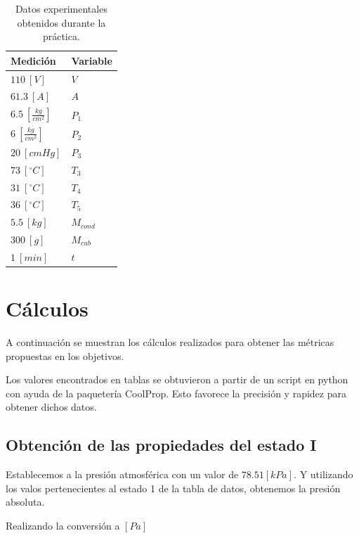 \documentclass[12pt,letterpaper]{article}
\begin{document}
\begin{table}[H] \label{tab:data}
\centering
\renewcommand{\arraystretch}{1.4}
    \begin{tabular}{|l|l|}
    \hline
    \textbf{Medición} & \textbf{Variable} \\
    \hline
    $110\ [V]$  & $V$ \\
    \hline
    $61.3\ [A]$  & $A$ \\
    \hline
    $6.5\ \left[\frac{kg}{cm^2}\right]$  
                 & $P_1$ \\
    \hline
    $6\ \left[\frac{kg}{cm^2}\right]$  
                 & $P_2$ \\
    \hline
    $20\ [cm Hg]$  & $P_3$ \\
    \hline
    $73\ [^\circ C]$  & $T_3$ \\
    \hline
    $31\ [^\circ C]$  & $T_4$ \\
    \hline
    $36\ [^\circ C]$  & $T_5$ \\
    \hline
    $5.5\ [kg]$  & $M_{cond}$ \\
    \hline
    $300\ [g]$  & $M_{cub}$ \\
    \hline
    $1\ [min]$  & $t$ \\
    \hline
    \end{tabular}
\caption{Datos experimentales obtenidos durante la práctica.}
\end{table}

\section{Cálculos}

A continuación se muestran los cálculos realizados para obtener las métricas propuestas en
los objetivos.

Los valores encontrados en tablas se obtuvieron a partir de un script en python con
ayuda de la paquetería CoolProp. Esto favorece la precisión y rapidez para obtener dichos datos.

\subsection{Obtención de las propiedades del estado I} \label{sec:estadoI}

Establecemos a la presión atmosférica con un valor de 
$78.51[kPa]$. Y utilizando los valos pertenecientes al estado 1 de la tabla de datos,
obtenemos la presión absoluta.

Realizando la conversión a $[Pa]$
\end{document}
